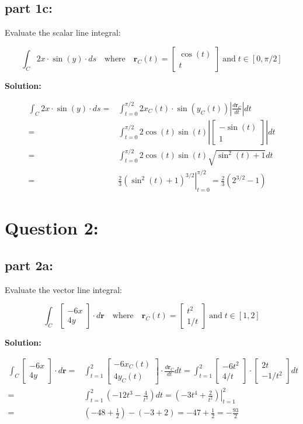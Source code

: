 \documentclass{article}
\newcommand{\abs}[1]{\left|#1\right|}
\newcommand{\colxyvec}[2]{\begin{bmatrix} #1 \\ #2 \end{bmatrix}}
\newcommand{\at}[1]{\left. #1 \right|}
\newcommand{\dr}[1]{\textcolor{dark_red}{#1}}
\begin{document}
\subsection*{part 1c:}

Evaluate the scalar line integral: 

\[\int_C 2x \cdot \sin(y) \cdot ds \quad\text{where}\quad \mathbf{r}_C(t) = \colxyvec{\cos(t)}{t} \;\text{and}\; t \in [0,\pi/2]\]

\vspace{5mm}
\dr{\textbf{Solution:}}

\dr{\begin{align*}
\int_C 2x \cdot \sin(y) \cdot ds = & \int_{t=0}^{\pi/2} 2x_C(t) \cdot \sin(y_C(t))\abs{\frac{d\mathbf{r}_C}{dt}}dt \\ 
= & \int_{t=0}^{\pi/2} 2\cos(t)\sin(t)\abs{\colxyvec{-\sin(t)}{1}}dt \\
= & \int_{t=0}^{\pi/2} 2\cos(t)\sin(t)\sqrt{\sin^2(t) + 1}dt \\
= & \at{\frac{2}{3}(\sin^2(t) + 1)^{3/2}}_{t=0}^{\pi/2} 
= \frac{2}{3}(2^{3/2} - 1)
\end{align*}}



\section*{Question 2:}

\subsection*{part 2a:}

Evaluate the vector line integral: 

\[\int_C \colxyvec{-6x}{4y} \cdot d\mathbf{r} \quad\text{where}\quad \mathbf{r}_C(t) = \colxyvec{t^2}{1/t} \;\text{and}\; t \in [1,2]\]

\vspace{5mm}
\dr{\textbf{Solution:}}

\dr{\begin{align*}
\int_C \colxyvec{-6x}{4y} \cdot d\mathbf{r} = & \int_{t=1}^2 \colxyvec{-6x_C(t)}{4y_C(t)} \cdot \frac{d\mathbf{r}_C}{dt}dt 
= \int_{t=1}^2 \colxyvec{-6t^2}{4/t} \cdot \colxyvec{2t}{-1/t^2}dt \\
= & \int_{t=1}^2 (-12t^3 - \frac{4}{t^3})dt 
= \at{(-3t^4 + \frac{2}{t^2})}_{t=1}^2 \\
= & (-48 + \frac{1}{2}) - (-3 + 2) 
= -47 + \frac{1}{2} = -\frac{93}{2}
\end{align*}}
\end{document}
